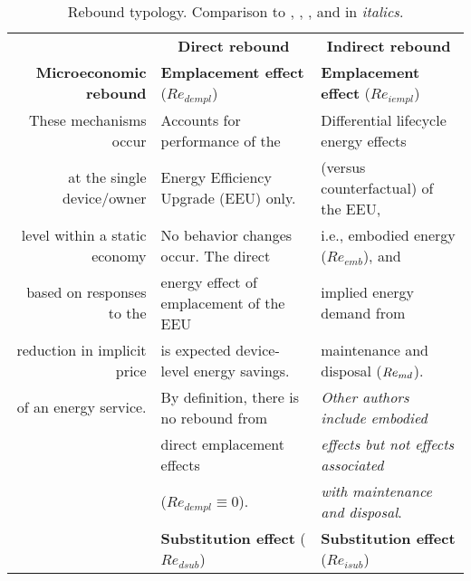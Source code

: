 


\begin{table}
\footnotesize
\begin{center}
\caption{Rebound typology. Comparison to \citet{Sorrell:2009cg}, \citet{Jenkins2011}, 
                           \citet{Thomas:2013aa,Thomas:2013ab}, and \citet{Walnum2014} in \emph{italics}.}
\label{tab:rebound_typology}
\begin{tabular}{ r l l }
\toprule
                                   & \multicolumn{1}{c}{\textbf{Direct rebound}} & \multicolumn{1}{c}{\textbf{Indirect rebound}} \\
                                   \cmidrule{2-3}
\textbf{Microeconomic rebound}     & \textbf{Emplacement effect} ($Re_{dempl}$)  & \textbf{Emplacement effect} ($Re_{iempl}$) \\
These mechanisms occur             & Accounts for performance of the             & Differential lifecycle energy effects \\
at the single device/owner         & Energy Efficiency Upgrade (EEU) only.       & (versus counterfactual) of the EEU, \\
level within a static economy      & No behavior changes occur. The direct       & i.e., embodied energy ($Re_{emb}$), and \\
based on responses to the          & energy effect of emplacement of the EEU     & implied energy demand from \\
reduction in implicit price        & is expected device-level energy savings.    & maintenance and disposal ($Re_{md}$). \\
of an energy service.              & By definition, there is no rebound from     & \emph{Other authors include embodied} \\
                                   & direct emplacement effects                  & \emph{effects but not effects associated} \\
                                   & ($Re_{dempl} \equiv 0$).                    & \emph{with maintenance and disposal}. \\
                                   \cmidrule{2-3}
                                   & \textbf{Substitution effect} ($Re_{dsub}$)  & \textbf{Substitution effect} ($Re_{isub}$) \\

\end{tabular}
\end{center}
\end{table}
